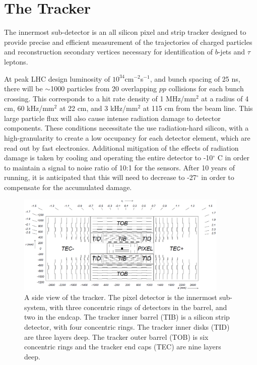 \section{The Tracker}
\label{tracker_description}

\par The innermost sub-detector is an all silicon pixel and strip
tracker designed to provide precise and efficient measurement of the
trajectories of charged particles and reconstruction secondary
vertices necessary for identification of $b$-jets and $\tau$ leptons.  

\par At peak LHC design luminosity of $10^{34}$cm$^{-2}$s$^{-1}$, and bunch
spacing of 25 ns, there will be $\sim$1000 particles from 20
overlapping $pp$ collisions for each bunch crossing.  This corresponds
to a hit rate density of 1 MHz/mm$^{2}$ at a radius of 4 cm, 60
kHz/mm$^{2}$ at 22 cm, and 3 kHz/mm$^{2}$ at 115 cm from the beam
line.  This large particle flux will also cause intense radiation
damage to detector components.  These conditions necessitate the use
radiation-hard silicon, with a high-granularity to create a low
occupancy for each detector element, which are read out by fast
electronics. Additional mitigation of the effects of radiation damage
is taken by cooling and operating the entire detector to -10$^{\circ}$
C in order to maintain a signal to noise ratio of 10:1 for the
sensors.  After 10 years of running, it is anticipated that this will
need to decrease to -27$^{\circ}$ in order to compensate for the
accumulated damage.    

\begin{figure}[h]
   \centering
  \includegraphics[width=0.9\textwidth]{Figures/CMS_Diagrams/Tracker__Side_View.png}
  \caption{A side view of the tracker.  The pixel detector is the
    innermost sub-system, with three concentric rings of detectors in
    the barrel, and two in the endcap.  The tracker inner barrel (TIB)
  is a silicon strip detector, with four concentric rings.  The
  tracker inner disks (TID) are three layers deep.  The tracker outer
  barrel (TOB) is six concentric rings and the tracker end caps (TEC)
  are nine layers deep. } \label{fig:tracker_side}
\end{figure}

